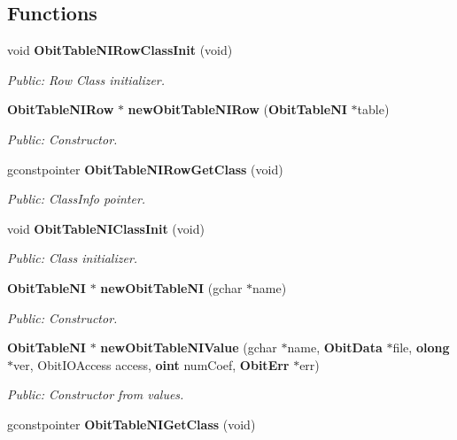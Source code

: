 \subsection*{Functions}
\begin{CompactItemize}
\item 
void {\bf Obit\-Table\-NIRow\-Class\-Init} (void)
\begin{CompactList}\small\item\em Public: Row Class initializer. \item\end{CompactList}\item 
{\bf Obit\-Table\-NIRow} $\ast$ {\bf new\-Obit\-Table\-NIRow} ({\bf Obit\-Table\-NI} $\ast$table)
\begin{CompactList}\small\item\em Public: Constructor. \item\end{CompactList}\item 
gconstpointer {\bf Obit\-Table\-NIRow\-Get\-Class} (void)
\begin{CompactList}\small\item\em Public: Class\-Info pointer. \item\end{CompactList}\item 
void {\bf Obit\-Table\-NIClass\-Init} (void)
\begin{CompactList}\small\item\em Public: Class initializer. \item\end{CompactList}\item 
{\bf Obit\-Table\-NI} $\ast$ {\bf new\-Obit\-Table\-NI} (gchar $\ast$name)
\begin{CompactList}\small\item\em Public: Constructor. \item\end{CompactList}\item 
{\bf Obit\-Table\-NI} $\ast$ {\bf new\-Obit\-Table\-NIValue} (gchar $\ast$name, {\bf Obit\-Data} $\ast$file, {\bf olong} $\ast$ver, Obit\-IOAccess access, {\bf oint} num\-Coef, {\bf Obit\-Err} $\ast$err)
\begin{CompactList}\small\item\em Public: Constructor from values. \item\end{CompactList}\item 
gconstpointer {\bf Obit\-Table\-NIGet\-Class} (void)

\end{CompactItemize}

